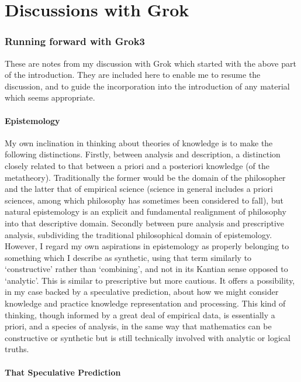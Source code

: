 \documentclass[10pt,titlepage]{book}
\begin{document}
\chapter{Discussions with Grok}

\subsection{Running forward with Grok3}

These are notes from my discussion with Grok which started with the above part of the introduction.
They are included here to enable me to resume the discussion, and to guide the incorporation into the introduction of any material which seems appropriate.

\subsubsection{Epistemology}

My own inclination in thinking about theories of knowledge is to make the following distinctions.   Firstly, between analysis and description, a distinction closely related to that between a priori and a posteriori knowledge (of the metatheory).  Traditionally the former would be the domain of the philosopher and the latter that of empirical science (science in general includes a priori sciences, among which philosophy has sometimes been considered to fall), but natural epistemology is an explicit and fundamental realignment of philosophy into that descriptive domain.  Secondly between pure analysis and prescriptive analysis, subdividing the traditional philosophical domain of epistemology.  However, I regard my own aspirations in epistemology as properly belonging to something which I describe as synthetic, using that term similarly to `constructive' rather than `combining', and not in its Kantian sense opposed to `analytic'.  This is similar to prescriptive but more cautious.  It offers a possibility, in my case backed by a speculative prediction, about how we might consider knowledge and practice knowledge representation and processing.  This kind of thinking, though informed by a great deal of empirical data, is essentially a priori, and a species of analysis, in the same way that mathematics can be constructive or synthetic but is still technically involved with analytic or logical truths.

\subsubsection{That Speculative Prediction}
\end{document}
